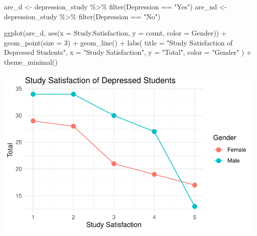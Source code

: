 \documentclass[
  letterpaper,
  DIV=11,
  numbers=noendperiod]{scrartcl}
\newenvironment{Shaded}{\begin{snugshade}}{\end{snugshade}}
\newcommand{\AttributeTok}[1]{\textcolor[rgb]{0.40,0.45,0.13}{#1}}
\newcommand{\DecValTok}[1]{\textcolor[rgb]{0.68,0.00,0.00}{#1}}
\newcommand{\FunctionTok}[1]{\textcolor[rgb]{0.28,0.35,0.67}{#1}}
\newcommand{\NormalTok}[1]{\textcolor[rgb]{0.00,0.23,0.31}{#1}}
\newcommand{\OtherTok}[1]{\textcolor[rgb]{0.00,0.23,0.31}{#1}}
\newcommand{\SpecialCharTok}[1]{\textcolor[rgb]{0.37,0.37,0.37}{#1}}
\newcommand{\StringTok}[1]{\textcolor[rgb]{0.13,0.47,0.30}{#1}}
\begin{document}
\begin{Shaded}
\begin{Highlighting}[]
\NormalTok{are\_d }\OtherTok{\textless{}{-}}\NormalTok{ depression\_study }\SpecialCharTok{\%\textgreater{}\%} \FunctionTok{filter}\NormalTok{(Depression }\SpecialCharTok{==} \StringTok{"Yes"}\NormalTok{)}
\NormalTok{are\_nd }\OtherTok{\textless{}{-}}\NormalTok{ depression\_study }\SpecialCharTok{\%\textgreater{}\%} \FunctionTok{filter}\NormalTok{(Depression }\SpecialCharTok{==} \StringTok{"No"}\NormalTok{)}

\FunctionTok{ggplot}\NormalTok{(are\_d, }\FunctionTok{aes}\NormalTok{(}\AttributeTok{x =}\NormalTok{ Study.Satisfaction, }\AttributeTok{y =}\NormalTok{ count, }\AttributeTok{color =}\NormalTok{ Gender)) }\SpecialCharTok{+}
  \FunctionTok{geom\_point}\NormalTok{(}\AttributeTok{size =} \DecValTok{3}\NormalTok{) }\SpecialCharTok{+}    
  \FunctionTok{geom\_line}\NormalTok{() }\SpecialCharTok{+}       
  \FunctionTok{labs}\NormalTok{(}
    \AttributeTok{title =} \StringTok{"Study Satisfaction of Depressed Students"}\NormalTok{,}
    \AttributeTok{x =} \StringTok{"Study Satisfaction"}\NormalTok{,}
    \AttributeTok{y =} \StringTok{"Total"}\NormalTok{,}
    \AttributeTok{color =} \StringTok{"Gender"}
\NormalTok{  ) }\SpecialCharTok{+}
  \FunctionTok{theme\_minimal}\NormalTok{() }
\end{Highlighting}
\end{Shaded}

\includegraphics{Data_files/figure-pdf/unnamed-chunk-5-1.pdf}
\end{document}
